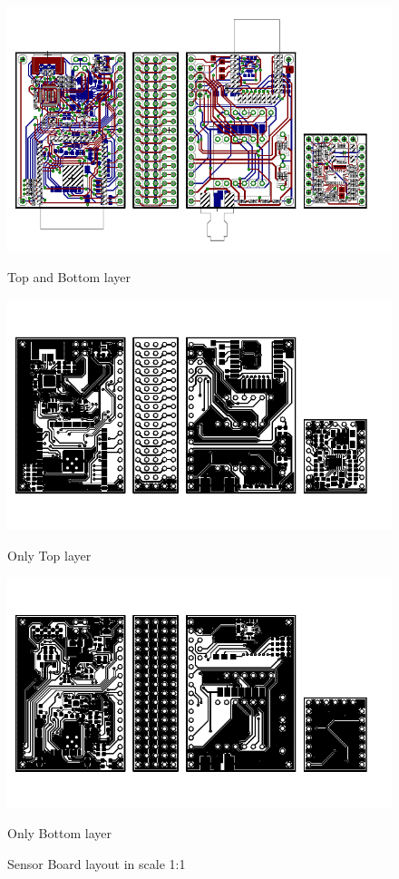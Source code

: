 \begin{figure}[H]
	\centering
	\includegraphics[scale=1]{img/brd.pdf}
	\begin{center}
		Top and Bottom layer
	\end{center}
	\includegraphics[scale=1]{img/brdTop.pdf}
	\begin{center}
		Only Top layer
	\end{center}
	\includegraphics[scale=1]{img/brdBottom.pdf}
	\begin{center}
		Only Bottom layer
	\end{center}
	\label{brd1}
	\caption{Sensor Board layout in scale 1:1}
\end{figure}


